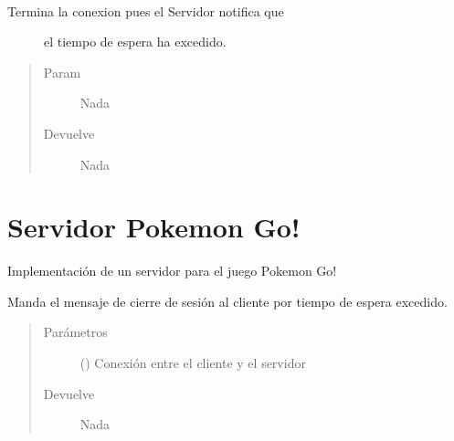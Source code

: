 \documentclass[letterpaper,10pt,spanish,openany,oneside]{sphinxmanual}
\begin{document}

\begin{fulllineitems}
\label{\detokenize{pokemonClient:pokemonClient.terminarConexion}}~\begin{description}
\item[{Termina la conexion pues el Servidor notifica que}] \leavevmode
el tiempo de espera ha excedido.

\end{description}
\begin{quote}\begin{description}
\item[{Param}] \leavevmode
Nada

\item[{Devuelve}] \leavevmode
Nada

\end{description}\end{quote}

\end{fulllineitems}



\section{Servidor Pokemon Go!}
\label{\detokenize{pokemonServer:servidor-pokemon-go}}\label{\detokenize{pokemonServer::doc}}
Implementación de un servidor para el juego Pokemon Go!

\label{\detokenize{pokemonServer:module-pokemonServer}}

\begin{fulllineitems}
\label{\detokenize{pokemonServer:pokemonServer.avisoTimeout}}
Manda el mensaje de cierre de sesión al cliente por tiempo de espera excedido.
\begin{quote}\begin{description}
\item[{Parámetros}] \leavevmode
{} () \textendash{} Conexión entre el cliente y el servidor

\item[{Devuelve}] \leavevmode
Nada

\end{description}\end{quote}

\end{fulllineitems}
\end{document}
